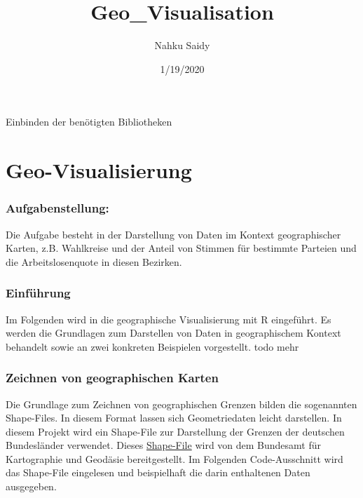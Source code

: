 \documentclass[]{article}
\title{Geo\_Visualisation}
\author{Nahku Saidy}
\date{1/19/2020}
\begin{document}
\maketitle

Einbinden der benötigten Bibliotheken

\hypertarget{geo-visualisierung}{%
\section{Geo-Visualisierung}\label{geo-visualisierung}}

\hypertarget{aufgabenstellung}{%
\subsubsection{Aufgabenstellung:}\label{aufgabenstellung}}

Die Aufgabe besteht in der Darstellung von Daten im Kontext
geographischer Karten, z.B. Wahlkreise und der Anteil von Stimmen für
bestimmte Parteien und die Arbeitslosenquote in diesen Bezirken.

\hypertarget{einfuxfchrung}{%
\subsubsection{Einführung}\label{einfuxfchrung}}

Im Folgenden wird in die geographische Visualisierung mit R eingeführt.
Es werden die Grundlagen zum Darstellen von Daten in geographischem
Kontext behandelt sowie an zwei konkreten Beispielen vorgestellt. todo
mehr

\hypertarget{zeichnen-von-geographischen-karten}{%
\subsubsection{Zeichnen von geographischen
Karten}\label{zeichnen-von-geographischen-karten}}

Die Grundlage zum Zeichnen von geographischen Grenzen bilden die
sogenannten Shape-Files. In diesem Format lassen sich Geometriedaten
leicht darstellen. In diesem Projekt wird ein Shape-File zur Darstellung
der Grenzen der deutschen Bundesländer verwendet. Dieses
\href{https://gdz.bkg.bund.de/index.php/default/digitale-geodaten/verwaltungsgebiete/nuts-gebiete-1-250-000-stand-01-01-nuts250-01-01.html}{Shape-File}
wird von dem Bundesamt für Kartographie und Geodäsie bereitgestellt. Im
Folgenden Code-Ausschnitt wird das Shape-File eingelesen und
beispielhaft die darin enthaltenen Daten ausgegeben.
\end{document}
